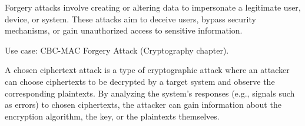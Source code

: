 {}
Forgery attacks involve creating or altering data to impersonate a legitimate user, device, or system. These attacks aim to deceive users, bypass security mechanisms, or gain unauthorized access to sensitive information.

Use case: CBC-MAC Forgery Attack (Cryptography chapter).


{}
A chosen ciphertext attack is a type of cryptographic attack where an attacker can choose ciphertexts to be decrypted by a target system and observe the corresponding plaintexts. By analyzing the system's responses (e.g., signals such as errors) to chosen ciphertexts, the attacker can gain information about the encryption algorithm, the key, or the plaintexts themselves.